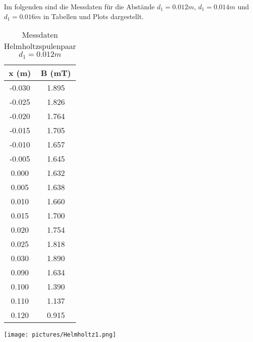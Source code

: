 Im folgenden sind die Messdaten für die Abstände $d_{1} = 0.012m$, $d_{1} = 0.014m$ und $d_{1} = 0.016m$ in Tabellen und Plots dargestellt.

\begin{table}
\centering
\caption{Messdaten Helmholtzspulenpaar $d_{1} = 0.012m$}
\begin{tabular}{c c}
  \toprule
   x (m) &  B (mT) \\
  \midrule
  -0.030 &        1.895 \\
  -0.025 &        1.826 \\
  -0.020 &        1.764 \\
  -0.015 &        1.705 \\
  -0.010 &        1.657 \\
  -0.005 &        1.645 \\
   0.000 &        1.632 \\
   0.005 &        1.638 \\
   0.010 &        1.660 \\
   0.015 &        1.700 \\
   0.020 &        1.754 \\
   0.025 &        1.818 \\
   0.030 &        1.890 \\
   0.090 &        1.634 \\
   0.100 &        1.390 \\
   0.110 &        1.137 \\
   0.120 &        0.915 \\
  \bottomrule
\end{tabular}
\end{table}

\texttt{[image: pictures/Helmholtz1.png]}    %

